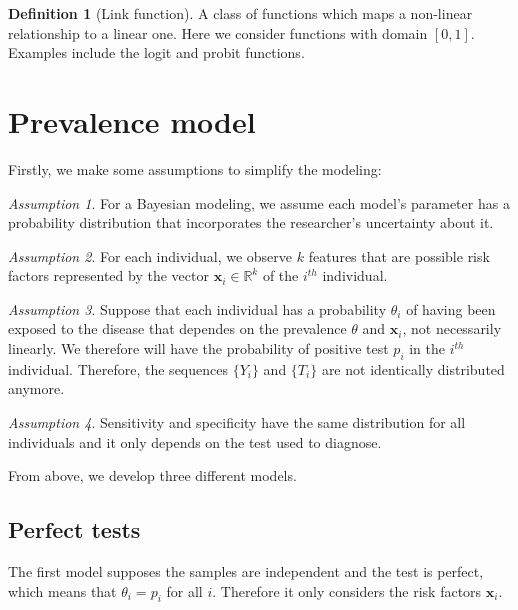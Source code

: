 \documentclass[a4paper, notitlepage, 11pt]{article}
\newcommand{\R}{\mathbb{R}}
\newcommand{\x}{\boldsymbol{x}}
\theoremstyle{definition}
\newtheorem{definition}{Definition}[section]
\theoremstyle{remark}
\newtheorem{assumption}{Assumption}
\begin{document}
\begin{definition}[Link function]
  A class of functions which maps a non-linear relationship to a linear one.
  Here we consider functions with domain $[0,1]$. Examples include the logit and probit
functions.
\end{definition}

\section{Prevalence model}

Firstly, we make some assumptions to simplify the modeling:

\begin{assumption}
  For a Bayesian modeling, we assume each model's parameter has a probability distribution that incorporates the researcher's uncertainty about it. 
\end{assumption}

\begin{assumption}
  For each individual, we observe $k$ features that are possible
  risk factors represented by the vector $\x_i \in \R^{k}$ of the $i^{th}$ individual.
\end{assumption}

\begin{assumption}
  Suppose that each individual has a probability $\theta_i$ of having been exposed
  to the disease that dependes on the prevalence $\theta$ and $\x_i$, not necessarily linearly.
  We therefore will have the probability of positive test $p_i$ in the
  $i^{th}$ individual. Therefore, the sequences $\{Y_i\}$ and $\{T_i\}$ are not
  identically distributed anymore.
\end{assumption} 

\begin{assumption}
  Sensitivity and specificity have the same distribution for all
  individuals and it only depends on the test used to diagnose. 
\end{assumption}

From above, we develop three different models.

\subsection{Perfect tests}

The first model supposes the samples are independent and the test is perfect,
which means that $\theta_i = p_i$ for all $i$. Therefore it only considers the risk factors $\x_i$. 
\end{document}
